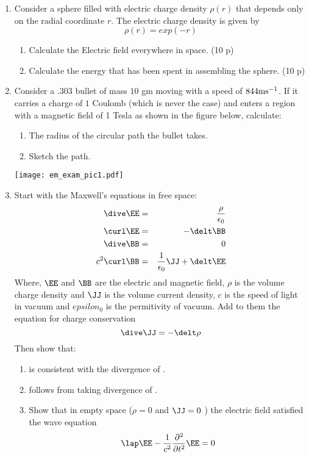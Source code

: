\documentclass[a4paper,twoside,10pt]{article}
\begin{document}
\begin {enumerate}

\item Consider a sphere filled with electric charge density $\rho(r)$ that depends only
on the radial coordinate $r$. The electric charge density is given by 
\begin{equation}
\rho(r) = exp(-r)
\end{equation} 
\begin{enumerate}
\item Calculate the Electric field everywhere in space. (10 p) 
\item Calculate the energy that has been spent in assembling the sphere. (10 p) 
\end{enumerate}

\item Consider a $.303$ bullet of mass $10$ gm moving with a speed of $844 {\rm m s}^{-1}$.
If it carries a charge of $1$ Coulomb (which is never the case) and enters a region with 
a magnetic field of 1 Tesla as shown in the figure below, calculate:
\begin{enumerate}
\item The radius of the circular path the bullet takes. 
\item Sketch the path. 
\end{enumerate}
\texttt{[image: em\_exam\_pic1.pdf]}



\item 
Start with the Maxwell's equations in free space:
\begin{eqnarray}
\dive \EE &=& \frac{\rho}{\epsilon_0} \label{eq:gauss}\\
\curl \EE &=& -\delt \BB \label{eq:faraday} \\
\dive \BB &=& 0 \label{eq:pole} \\
c^2\curl \BB &=& \frac{1}{\epsilon_0} \JJ  + \delt \EE \label{eq:ampere} 
\end{eqnarray}
Where, $\EE$ and $\BB$ are the electric and magnetic field, $\rho$ is the
volume charge density and $\JJ$ is the volume current density, $c$ is the speed of
light in vacuum and $epsilon_0$ is the permitivity of vacuum. 
Add to them the equation for charge conservation
\begin{equation}
\dive \JJ = -\delt \rho 
\label{eq:cont}
\end{equation}
Then show that: 
\begin{enumerate}
\item {} is consistent with the divergence of . 
\item {} follows from taking divergence of . 
\item Show that in empty space ($\rho=0$ and $\JJ = 0$ ) the electric
field satisfied the wave equation
\begin{equation}
\lap \EE - \frac{1}{c^2} \frac{\partial^2}{\partial t^2} \EE = 0 
\end{equation}
\end{enumerate}





\end{enumerate}
\end{document}
